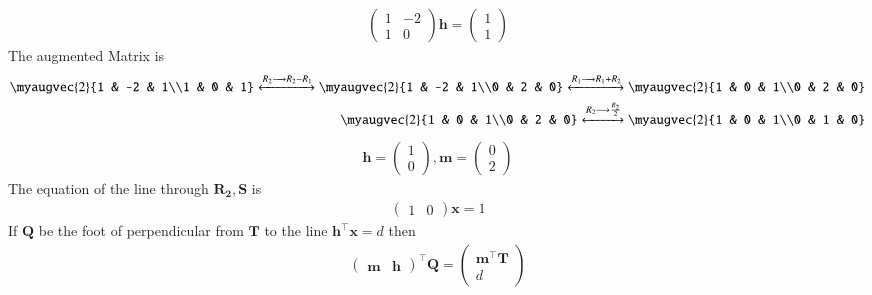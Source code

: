 \documentclass{beamer}
\theoremstyle{remark}
\newcommand{\myvec}[1]{\ensuremath{\begin{pmatrix}#1\end{pmatrix}}}
\let\vec\mathbf
\numberwithin{equation}{section}
\numberwithin{equation}{section}
\begin{document}
\begin{frame}
\begin{align}
\myvec{1&-2\\1&0}\vec{h} = \myvec{1\\1}
\end{align}
The augmented Matrix is
\begin{align}
  \myaugvec{2}{1 & -2 & 1\\1 & 0 & 1} \xleftrightarrow{R_2 \longrightarrow R_2-R_1} 
  \myaugvec{2}{1 & -2 & 1\\0 & 2 & 0} \xleftrightarrow{R_1 \longrightarrow R_1+R_2}
\myaugvec{2}{1 & 0 & 1\\0 & 2 & 0} \\
\myaugvec{2}{1 & 0 & 1\\0 & 2 & 0} \xleftrightarrow{R_2 \longrightarrow \frac{R_2}{2}} \myaugvec{2}{1 & 0 & 1\\0 & 1 & 0}
\end{align}
\begin{align}
\vec{h} = \myvec{1\\ 0}  , \vec{m} = \myvec{0\\2}
\end{align}
The equation of the line through $\vec{R_2},\vec{S}$ is
\begin{align}
\myvec{1&0}\vec{x} = 1   \label{eq: line2}
\end{align}
If $\vec{Q}$ be the foot of perpendicular from $\vec{T}$ to the line $\vec{h}^\top\vec{x} = d$ then
\begin{align}
\myvec{\vec{m}&\vec{h}}^\top\vec{Q} = \myvec{\vec{m}^\top\vec{T}\\d}
\end{align}
\end{frame}
\end{document}
